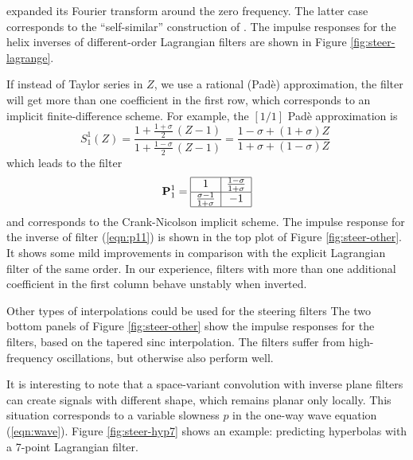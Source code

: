 expanded its Fourier transform around the zero frequency. The latter
case corresponds to the ``self-similar'' construction of
. The impulse responses for the helix
inverses of different-order Lagrangian filters are shown in Figure
\ref{fig:steer-lagrange}.
\par
If instead of Taylor series in $Z$, we use a rational (Pad\`{e})
approximation, the filter will get more than one coefficient in the
first row, which corresponds to an implicit finite-difference scheme.
For example, the $[1/1]$ Pad\`{e} approximation is
\begin{equation}
  \label{eqn:pade}
  S_1^1 (Z) = \frac
  {1 + \frac{1 + \sigma}{2}\,(Z-1)}
  {1 + \frac{1 - \sigma}{2}\,(Z-1)} = \frac
  {1-\sigma + (1+\sigma) Z}
  {1+\sigma + (1-\sigma) Z}\;
\end{equation}
which leads to the filter
\begin{equation}
  \label{eqn:p11}
  \bold{P}_1^1 =
  \begin{array}{|c|c|}
    \hline
    1 & \frac{1-\sigma}{1+\sigma} \\ \hline
    \frac{\sigma-1}{1+\sigma} & -1 \\ \hline
  \end{array}
\end{equation}
and corresponds to the Crank-Nicolson implicit scheme. The
impulse response for the inverse of filter (\ref{eqn:p11}) is shown in
the top plot of Figure \ref{fig:steer-other}. It shows some mild
improvements in comparison with the explicit Lagrangian filter of the
same order. In our experience, filters with more than one additional
coefficient in the first column behave unstably when inverted.

\par
Other types of interpolations could be used for the steering 
filters \cite{Fomel.sep.94.sergey2} The two bottom panels of Figure
\ref{fig:steer-other} show the impulse responses for the filters, based on
the tapered sinc interpolation. The filters suffer from high-frequency
oscillations, but otherwise also perform well.
\par
It is interesting to note that a space-variant convolution with
inverse plane filters can create signals with different shape, which
remains planar only locally. This situation corresponds to a variable
slowness $p$ in the one-way wave equation (\ref{eqn:wave}). Figure
\ref{fig:steer-hyp7} shows an example: predicting hyperbolas with a 7-point
Lagrangian filter.

